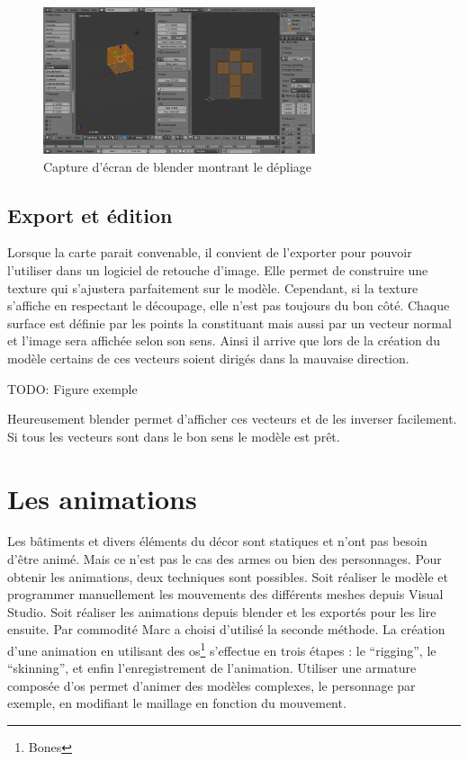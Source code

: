 \documentclass[11pt]{report}
\begin{document}
\begin{figure}[htbp]
\centering
\includegraphics[width=8cm]{unwrap.png}
\caption{Capture d'écran de blender montrant le dépliage}
\end{figure}

\subsection{Export et édition}

Lorsque la carte parait convenable, il convient de l’exporter pour pouvoir l’utiliser dans un logiciel de retouche d’image. Elle permet de construire une texture qui s’ajustera parfaitement sur le modèle.  Cependant, si la texture s’affiche en respectant le découpage, elle n’est pas toujours du bon côté. Chaque surface est définie par les points la constituant mais aussi par un vecteur normal et l’image sera affichée selon son sens. Ainsi il arrive que lors de la création du modèle certains de ces vecteurs soient dirigés dans la mauvaise direction.

TODO: Figure exemple

Heureusement blender permet d’afficher ces vecteurs et de les inverser facilement. Si tous les vecteurs sont dans le bon sens le modèle est prêt.

\section{Les animations}

Les bâtiments et divers éléments du décor sont statiques et n’ont pas besoin d’être animé. Mais ce n’est pas le cas des armes ou bien des personnages. Pour obtenir les animations, deux techniques sont possibles. Soit réaliser le modèle et programmer manuellement les mouvements des différents meshes depuis Visual Studio.
Soit réaliser les animations depuis blender et les exportés pour les lire ensuite. Par commodité Marc a choisi d’utilisé la seconde méthode. La création d’une animation en utilisant des os\footnote{Bones} s’effectue en trois étapes : le ``rigging'', le ``skinning'', et enfin l’enregistrement de l’animation. Utiliser une armature composée d'os permet d'animer des modèles complexes, le personnage par exemple, en modifiant le maillage en fonction du mouvement.
\end{document}
